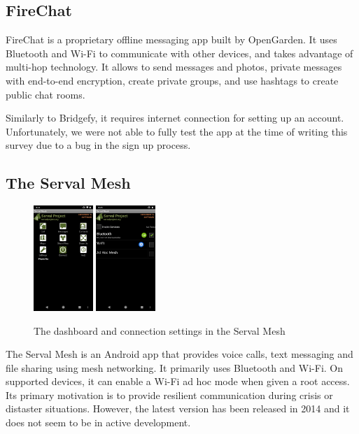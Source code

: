 \documentclass[conference,compsoc]{IEEEtran}
\begin{document}
\subsection{FireChat}
FireChat is a proprietary offline messaging app built by OpenGarden. It uses Bluetooth and Wi-Fi to communicate with other devices, and takes advantage of multi-hop technology. It allows to send messages and photos, private messages with end-to-end encryption, create private groups, and use hashtags to create public chat rooms. \cite{firechat}

Similarly to Bridgefy, it requires internet connection for setting up an account. Unfortunately, we were not able to fully test the app at the time of writing this survey due to a bug in the sign up process.

\subsection{The Serval Mesh}

\begin{figure}[h]
  \centering
  \includegraphics[width=0.2\textwidth]{serval1} \includegraphics[width=0.2\textwidth]{serval2}
  \caption{The dashboard and connection settings in the Serval Mesh}
\end{figure}


The Serval Mesh is an Android app that provides voice calls, text messaging and file sharing using mesh networking. It primarily uses Bluetooth and Wi-Fi. On supported devices, it can enable a Wi-Fi ad hoc mode when given a root access. Its primary motivation is to provide resilient communication during crisis or distaster situations. However, the latest version has been released in 2014 and it does not seem to be in active development.
\end{document}
